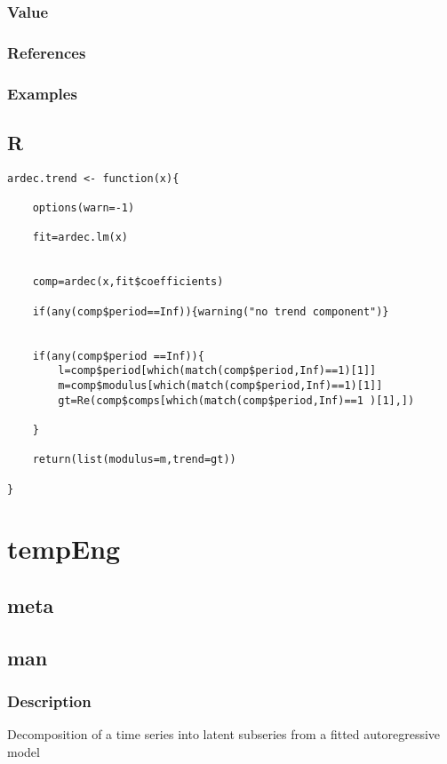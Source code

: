 \documentclass[11pt]{article}
\begin{document}
\subsubsection{Value}
\label{sec-4-2-5}
\subsubsection{References}
\label{sec-4-2-6}
\subsubsection{Examples}
\label{sec-4-2-7}
\subsection{R}
\label{sec-4-3}

\lstset{language=R,numbers=none}
\begin{lstlisting}
ardec.trend <- function(x){

    options(warn=-1)

    fit=ardec.lm(x)


    comp=ardec(x,fit$coefficients)

    if(any(comp$period==Inf)){warning("no trend component")}


    if(any(comp$period ==Inf)){
        l=comp$period[which(match(comp$period,Inf)==1)[1]]
        m=comp$modulus[which(match(comp$period,Inf)==1)[1]]
        gt=Re(comp$comps[which(match(comp$period,Inf)==1 )[1],])

    }

    return(list(modulus=m,trend=gt))  

}
\end{lstlisting}
\section{tempEng}
\label{sec-5}
\subsection{meta}
\label{sec-5-1}
\subsection{man}
\label{sec-5-2}
\subsubsection{Description}
\label{sec-5-2-1}

Decomposition of a time series into latent subseries from a fitted
autoregressive model
\end{document}

